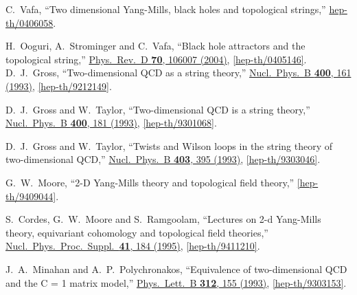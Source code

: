 \documentclass[11pt]{article}
\renewcommand{\[}{\begin{eqnarray}}
\renewcommand{\]}{\end{eqnarray}}
\begin{document}
 \begin{thebibliography}{99}
  C.~Vafa,
  ``Two dimensional Yang-Mills, black holes and topological strings,''
  \href{http://arxiv.org/abs/hep-th/0406058}{hep-th/0406058}.

  H.~Ooguri, A.~Strominger and C.~Vafa,
  ``Black hole attractors and the topological string,''
 \href{http://dx.doi.org/10.1103/PhysRevD.70.106007}{Phys.\ Rev.\ D {\bf 70}, 106007 (2004)},
 \href{http://arxiv.org/abs/hep-th/0405146}{[hep-th/0405146]}.
  D.~J.~Gross,
  ``Two-dimensional QCD as a string theory,''
  \href{http://dx.doi.org/10.1016/0550-3213(93)90402-B}{Nucl.\ Phys.\ B {\bf 400}, 161 (1993)},
  \href{http://arxiv.org/abs/hep-th/9212149}{[hep-th/9212149]}.

  D.~J.~Gross and W.~Taylor,
  ``Two-dimensional QCD is a string theory,''
  \href{http://dx.doi.org/10.1016/0550-3213(93)90403-C}{Nucl.\ Phys.\ B {\bf 400}, 181 (1993)},
  \href{http://arxiv.org/abs/hep-th/9301068}{[hep-th/9301068]}.

  D.~J.~Gross and W.~Taylor,
  ``Twists and Wilson loops in the string theory of two-dimensional QCD,''
   \href{http://dx.doi.org/10.1016/0550-3213(93)90042-N}{Nucl.\ Phys.\ B {\bf 403}, 395 (1993)},
  \href{http://arxiv.org/abs/hep-th/9303046}{[hep-th/9303046]}.

  G.~W.~Moore,
  ``2-D Yang-Mills theory and topological field theory,''
 \href{http://arxiv.org/abs/hep-th/9409044}{[hep-th/9409044]}.

  S.~Cordes, G.~W.~Moore and S.~Ramgoolam,
  ``Lectures on 2-d Yang-Mills theory, equivariant cohomology and topological field theories,''
 \href{http://dx.doi.org/10.1016/0920-5632(95)00434-B}{Nucl.\ Phys.\ Proc.\ Suppl.\  {\bf 41}, 184 (1995)},
 \href{http://arxiv.org/abs/hep-th/9411210}{[hep-th/9411210]}.

  J.~A.~Minahan and A.~P.~Polychronakos,
  ``Equivalence of two-dimensional QCD and the C = 1 matrix model,''
  \href{http://dx.doi.org/10.1016/0370-2693(93)90504-B}{Phys.\ Lett.\ B {\bf 312}, 155 (1993)},
 \href{http://arxiv.org/abs/hep-th/9303153}{[hep-th/9303153]}.


\end{thebibliography}
\end{document}
